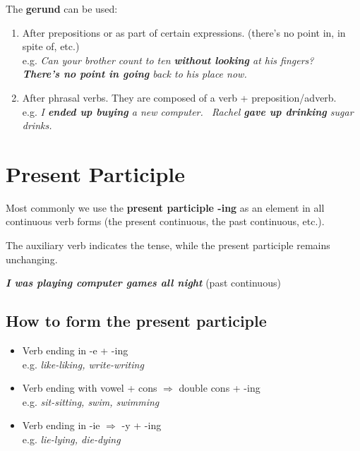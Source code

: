 \documentclass[hidelinks,10pt,a4paper]{article}
\begin{document}
The \textbf{gerund} can be used:
\begin{enumerate}[label=(\alph*)]
	\item After prepositions or as part of certain expressions. (there's no point in, in spite of, etc.)\\
		e.g. \textit{Can your brother count to ten \textbf{without looking} at his fingers? \\
					 \textbf{There's no point in going} back to his place now. }
	\item After phrasal verbs. They are composed of a verb + preposition/adverb. \\
		e.g. \textit{I \textbf{ended up buying} a new computer. \
		Rachel \textbf{gave up drinking} sugar drinks.}
\end{enumerate}

\section{Present Participle}
Most commonly we use the \textbf{present participle -ing} as an element in all continuous verb forms (the present continuous, the past continuous, etc.).

The auxiliary verb indicates the tense, while the present participle remains unchanging.

\begin{center}
	\textit{ \textbf{I was playing computer games all night} } (past continuous)
\end{center}

\subsection{How to form the present participle}

\begin{itemize}
	\item Verb ending in -e + -ing \\
		e.g. \textit{like-liking, write-writing}
	\item Verb ending with vowel + cons $\Rightarrow$ double cons + -ing \\
		e.g. \textit{sit-sitting, swim, swimming}
	\item Verb ending in -ie $\Rightarrow$ -y + -ing \\
		e.g. \textit{lie-lying, die-dying}
\end{itemize}
\end{document}
